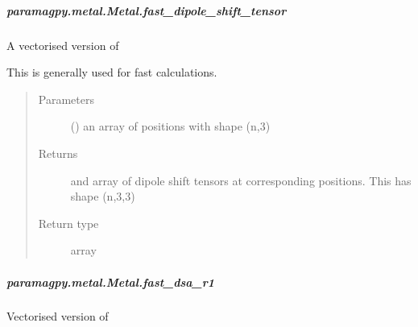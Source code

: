 \documentclass[a4paper,10pt,english,openany,oneside]{sphinxmanual}
\begin{document}
\begin{fulllineitems}
\begin{fulllineitems}
\subparagraph{paramagpy.metal.Metal.fast\_dipole\_shift\_tensor}
\label{\detokenize{reference/generated/paramagpy.metal.Metal.fast_dipole_shift_tensor:paramagpy-metal-metal-fast-dipole-shift-tensor}}\label{\detokenize{reference/generated/paramagpy.metal.Metal.fast_dipole_shift_tensor::doc}}

\begin{fulllineitems}
\label{\detokenize{reference/generated/paramagpy.metal.Metal.fast_dipole_shift_tensor:paramagpy.metal.Metal.fast_dipole_shift_tensor}}
A vectorised version of
{\hyperref[\detokenize{reference/generated/paramagpy.metal.Metal.dipole_shift_tensor:paramagpy.metal.Metal.dipole_shift_tensor}]{}}

This is generally used for fast calculations.
\begin{quote}\begin{description}
\item[{Parameters}] \leavevmode
{} () \textendash{} an array of positions with shape (n,3)

\item[{Returns}] \leavevmode
{} \textendash{} and array of dipole shift tensors at corresponding positions.
This has shape (n,3,3)

\item[{Return type}] \leavevmode
array

\end{description}\end{quote}

\end{fulllineitems}



\subparagraph{paramagpy.metal.Metal.fast\_dsa\_r1}
\label{\detokenize{reference/generated/paramagpy.metal.Metal.fast_dsa_r1:paramagpy-metal-metal-fast-dsa-r1}}\label{\detokenize{reference/generated/paramagpy.metal.Metal.fast_dsa_r1::doc}}

\begin{fulllineitems}
\label{\detokenize{reference/generated/paramagpy.metal.Metal.fast_dsa_r1:paramagpy.metal.Metal.fast_dsa_r1}}
Vectorised version of {\hyperref[\detokenize{reference/generated/paramagpy.metal.Metal.dsa_r1:paramagpy.metal.Metal.dsa_r1}]{}}


\end{fulllineitems}
\end{fulllineitems}
\end{fulllineitems}
\end{document}
